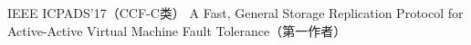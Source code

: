 \cvpub
{IEEE ICPADS'17（CCF-C类）} %
{A Fast, General Storage Replication Protocol for Active-Active Virtual Machine Fault  Tolerance（第一作者）} %
{} %
{} %
{ %
}

